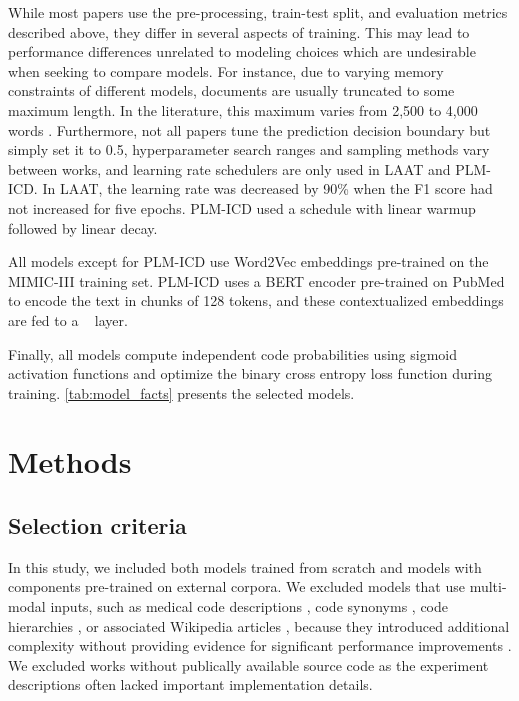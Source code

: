 \documentclass[anonymous=false, sigconf=true, review=false, natbib=true]{acmart}
\begin{document}
While most papers use the pre-processing, train-test split, and evaluation metrics described above, they differ in several aspects of training. This may lead to performance differences unrelated to modeling choices which are undesirable when seeking to compare models. 
For instance, due to varying memory constraints of different models, documents are usually truncated to some maximum length. In the literature, this maximum varies from 2,500 to 4,000 words \cite{mullenbachExplainablePredictionMedical2018, vuLabelAttentionModel2020, huangPLMICDAutomaticICD2022}.
Furthermore, not all papers tune the prediction decision boundary but simply set it to 0.5,
 hyperparameter search ranges and sampling methods  vary between works, and learning rate schedulers are only used in LAAT and PLM-ICD\cite{mullenbachExplainablePredictionMedical2018, liICDCodingClinical2020}. In LAAT, the learning rate was decreased by 90\% when the F1 score had not increased for five epochs. PLM-ICD used a schedule with linear warmup followed by linear decay. 



All models except for PLM-ICD use Word2Vec embeddings pre-trained on the MIMIC-III training set. PLM-ICD uses a BERT encoder pre-trained on PubMed to encode the text in chunks of 128 tokens, and these contextualized embeddings are fed to a \lalaat~ layer. 

Finally, all models compute independent code probabilities using sigmoid activation functions and optimize the binary cross entropy loss function during training.
\cref{tab:model_facts} presents the selected models.

 


\section{Methods}
\subsection{Selection criteria}\label{sec: inclusion and exclusion criteria}


In this study, we included both models trained from scratch and models with components pre-trained on external corpora. 
We excluded models that use multi-modal inputs, such as medical code descriptions \cite{kimReadAttendCode2021, mullenbachExplainablePredictionMedical2018, vuLabelAttentionModel2020, caoHyperCoreHyperbolicCograph2020, baoMedicalCodePrediction2021}, code synonyms \cite{yuanCodeSynonymsMatter2022}, code hierarchies \cite{caoHyperCoreHyperbolicCograph2020, xieEHRCodingMultiscale2019}, or associated Wikipedia articles \cite{baiImprovingMedicalCode2019}, because they introduced additional complexity without providing evidence for significant performance improvements \cite{mullenbachExplainablePredictionMedical2018, vuLabelAttentionModel2020, tengReviewDeepNeural2022}. We excluded works without publically available source code as the experiment descriptions often lacked important implementation details.
\end{document}
